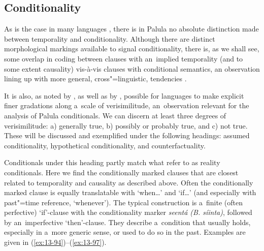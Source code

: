 \subsection{Conditionality}
\label{subsec:13-4-4}

As is the case in many languages \citep[257--258]{thompsonetal2007}, there is in Palula no absolute distinction made between temporality and conditionality. Although there are distinct morphological markings available to signal conditionality, there is, as we shall see, some overlap in coding between clauses with an~implied temporality (and to some extent causality) vis-à-vis clauses with conditional semantics, an observation lining up with more general, cross"=linguistic, tendencies \citep[161]{cristofaro2005}.



It is also, as noted by \citet[255--260]{thompsonetal2007}, as well as by \citet[333--334]{givon2001b}, possible for languages to make explicit finer gradations along a~scale of verisimilitude, an~observation relevant for the analysis of Palula conditionals. We can discern at least three degrees of verisimilitude: a) generally true, b) possibly or probably true, and c) not true. These will be discussed and exemplified under the following headings: assumed conditionality, hypothetical conditionality, and counterfactuality.



 Conditionals under this heading partly match what \citet[255--256]{thompsonetal2007} refer to as reality conditionals. Here we find the conditionally marked clauses that are closest related to temporality and causality as described above. Often the conditionally marked clause is equally translatable with `when{\ldots}' and `if{\ldots}' (and especially with past"=time reference, `whenever'). The typical construction is a~finite (often perfective) `if'-clause with the conditionality marker \textit{seentá (B. síinta)}, followed by an~imperfective `then'-clause. They describe a~condition that usually holds, especially in a~more generic sense, or used to do so in the past. Examples are given in (\ref{ex:13-94})--(\ref{ex:13-97}).

